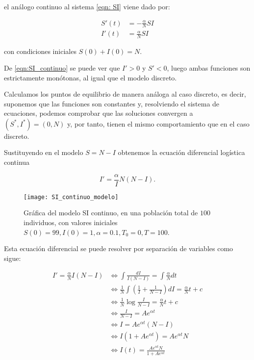 el análogo continuo al sistema \eqref{eqn: SI} viene dado por:

\begin{equation}
\label{eqn:SI_continuo}
\begin{aligned}
S'(t) & = -\frac{\alpha}{N}SI \\
I'(t) & = \frac{\alpha}{N}SI
\end{aligned}
\end{equation}

con condiciones iniciales $S(0)+I(0)=N$.

De \eqref{eqn:SI_continuo} se puede ver que $I'>0$ y $S'<0$, luego ambas funciones son estrictamente monótonas, al igual que el modelo discreto.

Calculamos los puntos de equilibrio de manera análoga al caso discreto, es decir, suponemos que las funciones son constantes y, resolviendo el sistema de ecuaciones, podemos comprobar que las soluciones convergen a $(S^*,I^*)=(0,N)$ y, por tanto, tienen el mismo comportamiento que en el caso discreto.

Sustituyendo en el modelo $S=N-I$ obtenemos la ecuación diferencial logística continua

$$I' = \frac{\alpha}I{N}(N-I).$$

\begin{figure}
\begin{center}
\caption{Gráfica del modelo SI continuo, en una población total de $100$ individuos, con valores iniciales $S(0)=99, I(0) = 1, \alpha = 0.1,T_0 = 0, T = 100$.}
\label{fig: SI_continuo}
\texttt{[image: SI\_continuo\_modelo]}
\end{center}
\end{figure}

Esta ecuación diferencial se puede resolver por separación de variables como sigue:

\begin{equation}
\begin{aligned}
I'=\frac{\alpha}{N}I(N-I) & \Leftrightarrow \int \frac{dI}{I(N-I)} = \int \frac{\alpha}{N} dt \\
& \Leftrightarrow \frac{1}{N}\int \left(\frac{1}{I}+\frac{1}{N-I}\right) dI = \frac{\alpha}{N}t+c \\
& \Leftrightarrow  \frac{1}{N}\log{\frac{I}{N-I}} = \frac{\alpha}{N}t+c \\
& \Leftrightarrow  \frac{I}{N-I} = Ae^{\alpha t} \\
& \Leftrightarrow  I = Ae^{\alpha t}(N-I) \\
& \Leftrightarrow  I(1+Ae^{\alpha t}) = Ae^{\alpha t}N \\
& \Leftrightarrow  I(t) = \frac{Ae^{\alpha t}N}{1+Ae^{\alpha t} }
\end{aligned}
\end{equation}

